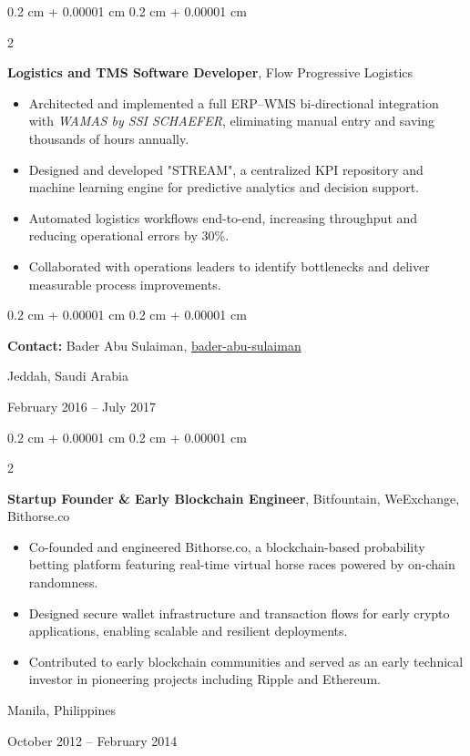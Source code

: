 \documentclass[10pt, letterpaper]{article}
\newenvironment{highlights}{
    \begin{itemize}[
        topsep=0.10 cm,
        parsep=0.10 cm,
        partopsep=0pt,
        itemsep=0pt,
        leftmargin=0.4 cm + 10pt
    ]
}{
    \end{itemize}
} %
\newenvironment{onecolentry}{
    \begin{adjustwidth}{
        0.2 cm + 0.00001 cm
    }{
        0.2 cm + 0.00001 cm
    }
}{
    \end{adjustwidth}
} %
\newenvironment{twocolentry}[2][]{
    \onecolentry
    \def\secondColumn{#2}
    \setcolumnwidth{\fill, 4.5 cm}
    \begin{paracol}{2}
}{
    \switchcolumn \raggedleft \secondColumn
    \end{paracol}
    \endonecolentry
} %
\let\hrefWithoutArrow\href
\renewcommand{\href}[2]{\hrefWithoutArrow{#1}{\ifthenelse{\equal{#2}{}}{ }{#2 }\raisebox{.15ex}{\footnotesize \faExternalLink*}}}
\begin{document}
    \begin{twocolentry}{
        Jeddah, Saudi Arabia

        February 2016 – July 2017
    }
        \textbf{Logistics and TMS Software Developer}, Flow Progressive Logistics
        \begin{highlights}
            \item Architected and implemented a full ERP–WMS bi-directional integration with \textit{WAMAS\textsuperscript{\textregistered} by SSI SCHAEFER}, eliminating manual entry and saving thousands of hours annually.
            \item Designed and developed "STREAM", a centralized KPI repository and machine learning engine for predictive analytics and decision support.
            \item Automated logistics workflows end-to-end, increasing throughput and reducing operational errors by 30\%.
            \item Collaborated with operations leaders to identify bottlenecks and deliver measurable process improvements.
        \end{highlights}

        \begin{onecolentry}
            \textbf{Contact:} Bader Abu Sulaiman,
            \mbox{\hrefWithoutArrow{https://www.linkedin.com/in/bader-abu-sulaiman-08a28276/}{{\footnotesize\faLinkedinIn}\hspace*{0.13cm}bader-abu-sulaiman}}%
        \end{onecolentry}
    \end{twocolentry}

    \vspace{0.2 cm}

    \begin{twocolentry}{
        Manila, Philippines

        October 2012 – February 2014
    }
        \textbf{Startup Founder \& Early Blockchain Engineer}, Bitfountain, WeExchange, Bithorse.co
        \begin{highlights}
            \item Co-founded and engineered Bithorse.co, a blockchain-based probability betting platform featuring real-time virtual horse races powered by on-chain randomness.
            \item Designed secure wallet infrastructure and transaction flows for early crypto applications, enabling scalable and resilient deployments.
            \item Contributed to early blockchain communities and served as an early technical investor in pioneering projects including Ripple and Ethereum.
        \end{highlights}
    \end{twocolentry}
\end{document}
